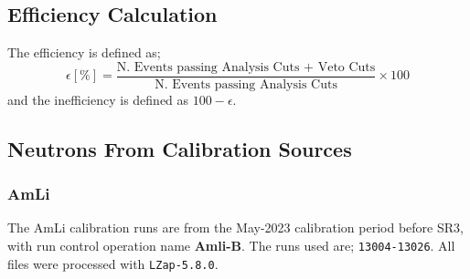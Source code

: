 \subsection{Efficiency Calculation}
The efficiency is defined as;
\begin{equation}
	\epsilon [\%] = \frac{\textrm{N. Events passing Analysis Cuts + Veto Cuts}}{\textrm{N. Events passing Analysis Cuts}} \times 100
	\label{eq:neutron_tagging_efficiency}
\end{equation}
and the inefficiency is defined as $100 - \epsilon$.

\subsection{Neutrons From Calibration Sources \label{sec:AmLi_Efficiency}}
\subsubsection{AmLi}
The AmLi calibration runs are from the May-2023 calibration period before SR3, with run control operation name \textbf{Amli-B}.
The runs used are; \lstinline{13004-13026}.
All files were processed with \lstinline{LZap-5.8.0}.

